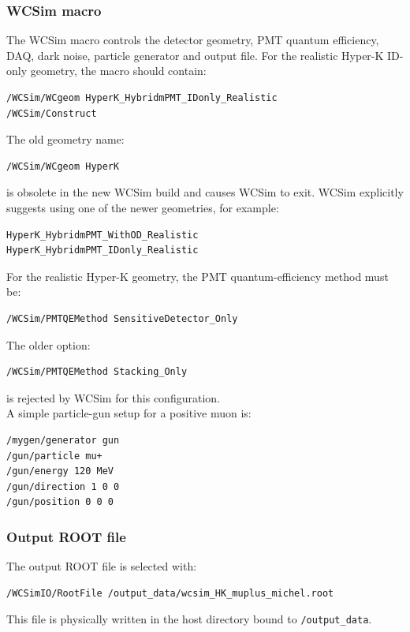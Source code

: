 \documentclass{article}
\numberwithin{table}{subsection}
\numberwithin{figure}{subsection}
\numberwithin{equation}{subsection}
\numberwithin{footnote}{subsection}
\begin{document}
\subsubsection{WCSim macro}
The WCSim macro controls the detector geometry, PMT quantum efficiency, DAQ, dark noise, particle generator and output file. For the realistic Hyper-K ID-only geometry, the macro should contain:
\begin{lstlisting}[style=terminal]
/WCSim/WCgeom HyperK_HybridmPMT_IDonly_Realistic
/WCSim/Construct
\end{lstlisting}
The old geometry name:
\begin{lstlisting}[style=terminal]
/WCSim/WCgeom HyperK
\end{lstlisting}
is obsolete in the new WCSim build and causes WCSim to exit. WCSim explicitly suggests using one of the newer geometries, for example:
\begin{lstlisting}[style=terminal]
HyperK_HybridmPMT_WithOD_Realistic
HyperK_HybridmPMT_IDonly_Realistic
\end{lstlisting}
For the realistic Hyper-K geometry, the PMT quantum-efficiency method must be:
\begin{lstlisting}[style=terminal]
/WCSim/PMTQEMethod SensitiveDetector_Only
\end{lstlisting}
The older option:
\begin{lstlisting}[style=terminal]
/WCSim/PMTQEMethod Stacking_Only
\end{lstlisting}
is rejected by WCSim for this configuration.\\
A simple particle-gun setup for a positive muon is:
\begin{lstlisting}[style=terminal]
/mygen/generator gun
/gun/particle mu+
/gun/energy 120 MeV
/gun/direction 1 0 0
/gun/position 0 0 0
\end{lstlisting}
\subsubsection{Output ROOT file}
The output ROOT file is selected with:
\begin{lstlisting}[style=terminal]
/WCSimIO/RootFile /output_data/wcsim_HK_muplus_michel.root
\end{lstlisting}
This file is physically written in the host directory bound to \texttt{/output\_data}.
\end{document}
